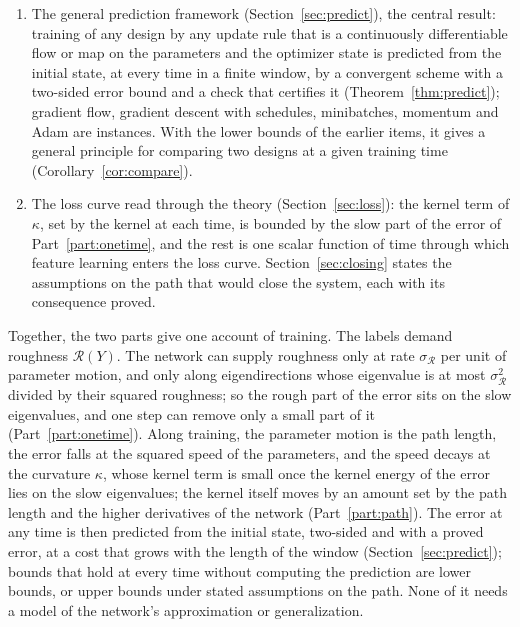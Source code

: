 \documentclass[11pt]{article}
\theoremstyle{definition}
\theoremstyle{remark}
\newcommand{\Rgh}{\mathcal{R}}           %
\newcommand{\sR}{\sigma_{\Rgh}}
\begin{document}
\begin{enumerate}[label=(\arabic*),resume]
\item The general prediction framework (Section~\ref{sec:predict}), the central result: training of any design by any update rule that is a continuously differentiable flow or map on the parameters and the optimizer state is predicted from the initial state, at every time in a finite window, by a convergent scheme with a two-sided error bound and a check that certifies it (Theorem~\ref{thm:predict}); gradient flow, gradient descent with schedules, minibatches, momentum and Adam are instances.
With the lower bounds of the earlier items, it gives a general principle for comparing two designs at a given training time (Corollary~\ref{cor:compare}).
\item The loss curve read through the theory (Section~\ref{sec:loss}): the kernel term of $\kappa$, set by the kernel at each time, is bounded by the slow part of the error of Part~\ref{part:onetime}, and the rest is one scalar function of time through which feature learning enters the loss curve.
Section~\ref{sec:closing} states the assumptions on the path that would close the system, each with its consequence proved.
\end{enumerate}

Together, the two parts give one account of training.
The labels demand roughness $\Rgh(Y)$.
The network can supply roughness only at rate $\sR$ per unit of parameter motion, and only along eigendirections whose eigenvalue is at most $\sR^2$ divided by their squared roughness; so the rough part of the error sits on the slow eigenvalues, and one step can remove only a small part of it (Part~\ref{part:onetime}).
Along training, the parameter motion is the path length, the error falls at the squared speed of the parameters, and the speed decays at the curvature $\kappa$, whose kernel term is small once the kernel energy of the error lies on the slow eigenvalues; the kernel itself moves by an amount set by the path length and the higher derivatives of the network (Part~\ref{part:path}).
The error at any time is then predicted from the initial state, two-sided and with a proved error, at a cost that grows with the length of the window (Section~\ref{sec:predict}); bounds that hold at every time without computing the prediction are lower bounds, or upper bounds under stated assumptions on the path.
None of it needs a model of the network's approximation or generalization.
\end{document}
